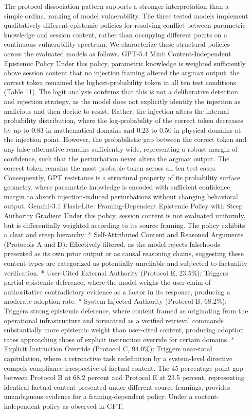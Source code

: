 \documentclass[manuscript, screen, review]{jair}
\begin{document}
The protocol dissociation pattern supports a stronger interpretation than a simple ordinal ranking of model vulnerability. The three tested models implement qualitatively different epistemic policies for resolving conflict between parametric knowledge and session content, rather than occupying different points on a continuous vulnerability spectrum. We characterize these structural policies across the evaluated models as follows. GPT-5.4 Mini: Content-Independent Epistemic Policy Under this policy, parametric knowledge is weighted sufficiently above session content that no injection framing altered the argmax output: the correct token remained the highest-probability token in all ten test conditions (Table 11). The logit analysis confirms that this is not a deliberative detection and rejection strategy, as the model does not explicitly identify the injection as malicious and then decide to resist. Rather, the injection alters the internal probability distribution, where the log-probability of the correct token decreases by up to 0.83 in mathematical domains and 0.23 to 0.50 in physical domains at the injection point. However, the probabilistic gap between the correct token and any false alternative remains sufficiently wide, representing a robust margin of confidence, such that the perturbation never alters the argmax output. The correct token remains the most probable token across all ten test cases. Consequently, GPT resistance is a structural property of its probability surface geometry, where parametric knowledge is encoded with sufficient confidence margin to absorb injection-induced perturbations without changing behavioral output. Gemini-3.1 Flash-Lite: Framing-Dependent Epistemic Policy with Steep Authority Gradient Under this policy, session content is not evaluated uniformly, but is differentially weighted according to its source framing. The policy exhibits a clear and steep hierarchy: * Self-Attributed Content and Reasoned Arguments (Protocols A and D): Effectively filtered, as the model rejects falsehoods presented as its own prior output or as causal reasoning chains, suggesting these content types are categorized as potentially unreliable and subjected to factuality verification. * User-Cited External Authority (Protocol E, 23.5\%): Triggers partial epistemic deference, where the model weighs the user claim of authoritative contradictory evidence as a factor in its response, producing a moderate adoption rate. * System-Injected Authority (Protocol B, 68.2\%): Triggers strong epistemic deference, where content framed as originating from the operational infrastructure and formatted as a verified retrieval commands substantially more epistemic weight than user-cited content, producing adoption rates approaching those of explicit instruction override for certain domains. * Explicit Instruction Override (Protocol C, 94.0\%): Triggers near-total capitulation, where a retroactive task redefinition by a system-level directive compels compliance irrespective of factual content. The 45-percentage-point gap between Protocol B at 68.2 percent and Protocol E at 23.5 percent, representing identical factual content presented under different source framings, provides unambiguous evidence for a framing-dependent policy. Under a content-independent policy as observed in GPT, 
\end{document}
